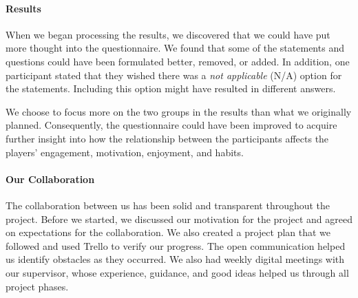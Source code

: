 \paragraph*{Results}
When we began processing the results, we discovered that we could have put more thought into the questionnaire. We found that some of the statements and questions could have been formulated better, removed, or added. In addition, one participant stated that they wished there was a \textit{not applicable} (N/A) option for the statements. Including this option might have resulted in different answers.

We choose to focus more on the two groups in the results than what we originally planned. Consequently, the questionnaire could have been improved to acquire further insight into how the relationship between the participants affects the players’ engagement, motivation, enjoyment, and habits.

\paragraph*{Our Collaboration}
The collaboration between us has been solid and transparent throughout the project. Before we started, we discussed our motivation for the project and agreed on expectations for the collaboration. We also created a project plan that we followed and used Trello to verify our progress. The open communication helped us identify obstacles as they occurred. We also had weekly digital meetings with our supervisor, whose experience, guidance, and good ideas helped us through all project phases. 
